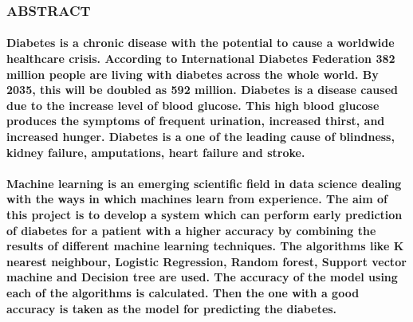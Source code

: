 \documentclass{beamer}
\begin{document}
\begin{frame}
  \frametitle{\bf ABSTRACT}
  \normalsize{\paragraph{Diabetes is a chronic disease with the potential to cause a worldwide healthcare crisis. According to International Diabetes Federation 382 million people are living with diabetes across the whole world. By 2035, this will be doubled as 592 million. Diabetes is a disease caused due to the increase level of blood glucose. This high blood glucose produces the symptoms of frequent urination, increased thirst, and increased hunger. Diabetes is a one of the leading cause of blindness, kidney failure, amputations, heart failure and stroke.}}
\end{frame}

\begin{frame}
  
  \normalsize{\paragraph{Machine learning is an emerging scientific field in data science dealing with the ways in which machines learn from experience. The aim of this project is to develop a system which can perform early prediction of diabetes for a patient with a higher accuracy by combining the results of different machine learning techniques. The algorithms like K nearest neighbour, Logistic Regression, Random forest, Support vector machine and Decision tree are used. The accuracy of the model using each of the algorithms is calculated. Then the one with a good accuracy is taken as the model for predicting the diabetes.
    }
}
\end{frame}

\end{document}

